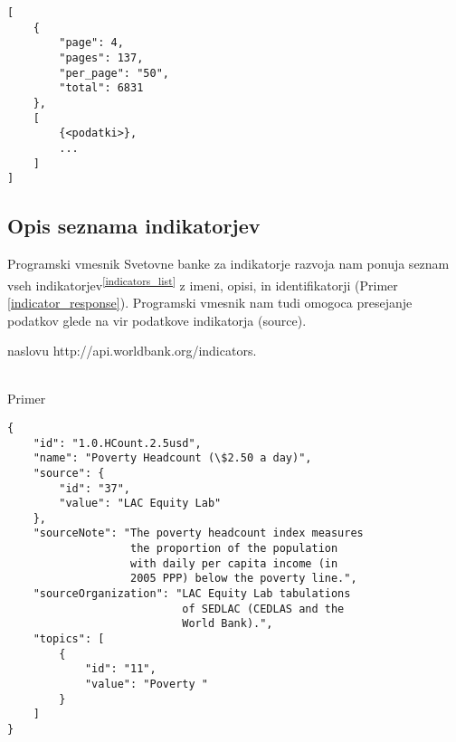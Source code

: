 \begin{snippet}
\begin{center}
\begin{lstlisting}
[
    {
    	"page": 4,
		"pages": 137,
		"per_page": "50",
		"total": 6831
    },
    [
        {<podatki>},
        ...
    ]
]
\end{lstlisting}
\end{center}
\caption{Osnovna oblika odgovora programskega vmesnika Svetovne banke v obliki
JSON, ob veljavni poizvedbi. Prvi element opisuje kolicino dobljenih in vseh 
podatkov, drugi element pa vsebuje s stranjo in stevilom podatkov na stran 
doloceni izsek celotnih podatkov.}
\label{basic_response}
\end{snippet} 



\subsection{Opis seznama indikatorjev}

Programski vmesnik Svetovne banke za indikatorje razvoja nam ponuja seznam 
vseh indikatorjev\textsuperscript{\ref{indicators_list}} z imeni, opisi, in 
identifikatorji (Primer \ref{indicator_response}). Programski vmesnik nam tudi
omogoca presejanje podatkov glede na vir podatkove indikatorja (source).

naslovu http://api.worldbank.org/indicators.

\ \\
Primer 


\begin{snippet}
\begin{center}
\begin{lstlisting}
{
    "id": "1.0.HCount.2.5usd",
    "name": "Poverty Headcount (\$2.50 a day)",
    "source": {
        "id": "37",
        "value": "LAC Equity Lab"
    },
    "sourceNote": "The poverty headcount index measures 
                   the proportion of the population
                   with daily per capita income (in 
                   2005 PPP) below the poverty line.",
    "sourceOrganization": "LAC Equity Lab tabulations
                           of SEDLAC (CEDLAS and the
                           World Bank).",
    "topics": [
        {
            "id": "11",
            "value": "Poverty "
        }
    ]
}
\end{lstlisting}
\end{center}
\caption{Podatki indikatorja stopnja revscine pri dohodku 2,5 dolarja na dan v 
obliki JSON.}
\label{indicator_response}
\end{snippet} 



